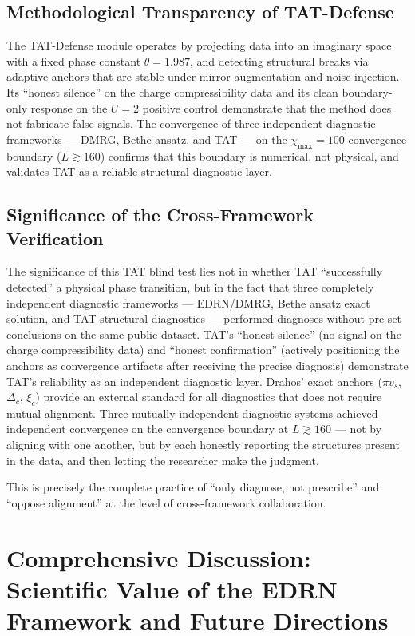 \documentclass[prb,reprint,twocolumn,superscriptaddress]{revtex4-2}
\begin{document}
\subsection{Methodological Transparency of TAT-Defense}

The TAT-Defense module operates by projecting data into an imaginary space with a fixed phase constant $\theta = 1.987$, and detecting structural breaks via adaptive anchors that are stable under mirror augmentation and noise injection. Its ``honest silence'' on the charge compressibility data and its clean boundary-only response on the $U=2$ positive control demonstrate that the method does not fabricate false signals. The convergence of three independent diagnostic frameworks --- DMRG, Bethe ansatz, and TAT --- on the $\chi_{\max}=100$ convergence boundary ($L \gtrsim 160$) confirms that this boundary is numerical, not physical, and validates TAT as a reliable structural diagnostic layer.


\subsection{Significance of the Cross-Framework Verification}

The significance of this TAT blind test lies not in whether TAT ``successfully detected'' a physical phase transition, but in the fact that three completely independent diagnostic frameworks --- EDRN/DMRG, Bethe ansatz exact solution, and TAT structural diagnostics --- performed diagnoses without pre-set conclusions on the same public dataset. TAT's ``honest silence'' (no signal on the charge compressibility data) and ``honest confirmation'' (actively positioning the anchors as convergence artifacts after receiving the precise diagnosis) demonstrate TAT's reliability as an independent diagnostic layer. Drahos' exact anchors ($\pi v_s$, $\Delta_c$, $\xi_c$) provide an external standard for all diagnostics that does not require mutual alignment. Three mutually independent diagnostic systems achieved independent convergence on the convergence boundary at $L \gtrsim 160$ --- not by aligning with one another, but by each honestly reporting the structures present in the data, and then letting the researcher make the judgment.

This is precisely the complete practice of ``only diagnose, not prescribe'' and ``oppose alignment'' at the level of cross-framework collaboration.

\section{Comprehensive Discussion: Scientific Value of the EDRN Framework and Future Directions}\label{sec:discussion2}
\end{document}
